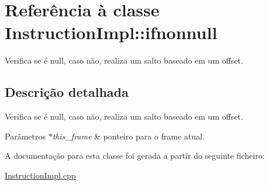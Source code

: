 \hypertarget{class_instruction_impl_1_1ifnonnull}{}\section{Referência à classe Instruction\+Impl\+:\+:ifnonnull}
\label{class_instruction_impl_1_1ifnonnull}


Verifica se é null, caso não, realiza um salto baseado em um offset.  




\subsection{Descrição detalhada}
Verifica se é null, caso não, realiza um salto baseado em um offset. 


\begin{DoxyParams}{Parâmetros}
{\em $\ast$this\+\_\+frame} & ponteiro para o frame atual.  \\
\hline
\end{DoxyParams}


A documentação para esta classe foi gerada a partir do seguinte ficheiro\+:\begin{DoxyCompactItemize}
\item 
\hyperlink{_instruction_impl_8cpp}{Instruction\+Impl.\+cpp}\end{DoxyCompactItemize}
